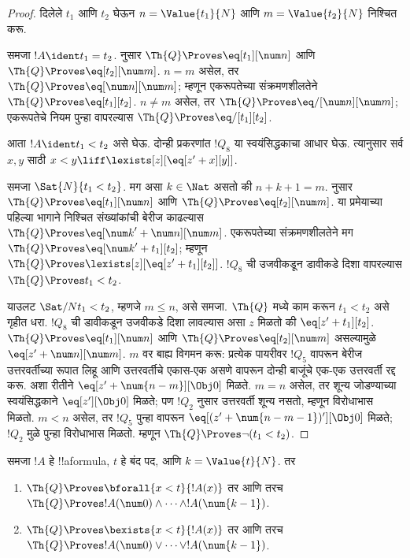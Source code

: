 \documentclass[../../../include/open-logic-section]{subfiles}
\begin{document}
\begin{proof}
दिलेले $t_1$ आणि $t_2$ घेऊन
$n = \Value{t_1}{N}$ आणि $m = \Value{t_2}{N}$
निश्चित करू.

समजा $!A \ident t_1 = t_2$.
 नुसार
$\Th{Q} \Proves \eq[t_1][\num n]$ आणि
$\Th{Q} \Proves \eq[t_2][\num m]$.
$n = m$ असेल, तर
$\Th{Q} \Proves \eq[\num n][\num m]$;
म्हणून एकरूपतेच्या संक्रमणशीलतेने
$\Th{Q} \Proves \eq[t_1][t_2]$.
$n \neq m$ असेल, तर
$\Th{Q} \Proves \eq/[\num n][\num m]$;
एकरूपतेचे नियम पुन्हा वापरल्यास
$\Th{Q} \Proves \eq/[t_1][t_2]$.

आता $!A \ident t_1 < t_2$ असे घेऊ. दोन्ही प्रकरणांत
$!Q_8$ या स्वयंसिद्धकाचा आधार घेऊ. त्यानुसार सर्व
$x,y$ साठी
$x < y \liff \lexists[z][\eq[z' + x][y]]$.

समजा $\Sat{N}{t_1 < t_2}$. मग असा $k \in \Nat$
असतो की $n + k + 1 = m$.
 नुसार
$\Th{Q} \Proves \eq[t_1][\num n]$ आणि
$\Th{Q} \Proves \eq[t_2][\num m]$.
या प्रमेयाच्या पहिल्या भागाने निश्चित संख्यांकांची बेरीज
काढल्यास
$\Th{Q} \Proves \eq[{\num k}' + \num n][\num m]$.
एकरूपतेच्या संक्रमणशीलतेने मग
$\Th{Q} \Proves \eq[{\num k}' + t_1][t_2]$;
म्हणून
$\Th{Q} \Proves \lexists[z][\eq[z' + t_1][t_2]]$.
$!Q_8$ ची उजवीकडून डावीकडे दिशा वापरल्यास
$\Th{Q} \Proves t_1 < t_2$.

याउलट $\Sat/{N}{t_1 < t_2}$, म्हणजे $m \leq n$,
असे समजा.
%
$\Th{Q}$ मध्ये काम करून $t_1 < t_2$ असे गृहीत धरा.
$!Q_8$ ची डावीकडून उजवीकडे दिशा लावल्यास असा $z$
मिळतो की $\eq[z' + t_1][t_2]$.
$\Th{Q} \Proves \eq[t_1][\num n]$ आणि
$\Th{Q} \Proves \eq[t_2][\num m]$ असल्यामुळे
$\eq[z' + \num n][\num m]$.
%
$m$ वर बाह्य विगमन करू: प्रत्येक पायरीवर $!Q_5$
वापरून बेरीज उत्तरवर्तीच्या रूपात लिहू आणि उत्तरवर्तीचे
एकास-एक असणे वापरून दोन्ही बाजूंचे एक-एक उत्तरवर्ती
रद्द करू. अशा रीतीने
$\eq[z' + \num{n - m}][\Obj 0]$ मिळते.
$m = n$ असेल, तर शून्य जोडण्याच्या स्वयंसिद्धकाने
$\eq[z'][\Obj 0]$ मिळते; पण $!Q_2$ नुसार उत्तरवर्ती
शून्य नसतो, म्हणून विरोधाभास मिळतो.
$m < n$ असेल, तर $!Q_5$ पुन्हा वापरून
$\eq[(z' + \num{n - m - 1})'][\Obj 0]$ मिळते;
$!Q_2$ मुळे पुन्हा विरोधाभास मिळतो.
म्हणून $\Th{Q} \Proves \lnot(t_1 < t_2)$.
\end{proof}

\begin{lem}
समजा $!A$ हे !!a{formula}, $t$ हे बंद पद, आणि
$k=\Value{t}{N}$. तर
\begin{enumerate}
\item $\Th{Q} \Proves \bforall{x<t}{!A(x)}$ तर आणि तरच $\Th{Q} \Proves
    !A(\num 0) \land \dots \land !A(\num{k-1})$.
\item $\Th{Q} \Proves \bexists{x<t}{!A(x)}$ तर आणि तरच $\Th{Q} \Proves
    !A(\num 0) \lor \dots \lor !A(\num{k-1})$.
\end{enumerate}
\end{lem}
\end{document}
